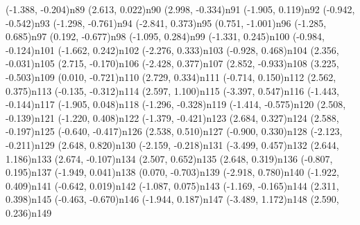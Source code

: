 \dotnode[dotstyle=Bsquare](-1.388, -0.204){n89}
\dotnode[dotstyle=Bo](2.613, 0.022){n90}
\dotnode[dotstyle=Bo](2.998, -0.334){n91}
\dotnode[dotstyle=Btriangle](-1.905, 0.119){n92}
\dotnode[dotstyle=Bsquare](-0.942, -0.542){n93}
\dotnode[dotstyle=Bsquare](-1.298, -0.761){n94}
\dotnode[dotstyle=Btriangle](-2.841, 0.373){n95}
\dotnode[dotstyle=Bsquare](0.751, -1.001){n96}
\dotnode[dotstyle=Btriangle](-1.285, 0.685){n97}
\dotnode[dotstyle=Bsquare](0.192, -0.677){n98}
\dotnode[dotstyle=Bsquare](-1.095, 0.284){n99}
\dotnode[dotstyle=Bsquare](-1.331, 0.245){n100}
\dotnode[dotstyle=Bsquare](-0.984, -0.124){n101}
\dotnode[dotstyle=Btriangle](-1.662, 0.242){n102}
\dotnode[dotstyle=Btriangle](-2.276, 0.333){n103}
\dotnode[dotstyle=Bsquare](-0.928, 0.468){n104}
\dotnode[dotstyle=Bo](2.356, -0.031){n105}
\dotnode[dotstyle=Bo](2.715, -0.170){n106}
\dotnode[dotstyle=Btriangle](-2.428, 0.377){n107}
\dotnode[dotstyle=Bo](2.852, -0.933){n108}
\dotnode[dotstyle=Bo](3.225, -0.503){n109}
\dotnode[dotstyle=Bsquare](0.010, -0.721){n110}
\dotnode[dotstyle=Bo](2.729, 0.334){n111}
\dotnode[dotstyle=Bsquare](-0.714, 0.150){n112}
\dotnode[dotstyle=Bo](2.562, 0.375){n113}
\dotnode[dotstyle=Bsquare](-0.135, -0.312){n114}
\dotnode[dotstyle=Bo](2.597, 1.100){n115}
\dotnode[dotstyle=Btriangle](-3.397, 0.547){n116}
\dotnode[dotstyle=Bsquare](-1.443, -0.144){n117}
\dotnode[dotstyle=Btriangle](-1.905, 0.048){n118}
\dotnode[dotstyle=Bsquare](-1.296, -0.328){n119}
\dotnode[dotstyle=Bsquare](-1.414, -0.575){n120}
\dotnode[dotstyle=Bo](2.508, -0.139){n121}
\dotnode[dotstyle=Bsquare](-1.220, 0.408){n122}
\dotnode[dotstyle=Bsquare](-1.379, -0.421){n123}
\dotnode[dotstyle=Bo](2.684, 0.327){n124}
\dotnode[dotstyle=Bo](2.588, -0.197){n125}
\dotnode[dotstyle=Bsquare](-0.640, -0.417){n126}
\dotnode[dotstyle=Bo](2.538, 0.510){n127}
\dotnode[dotstyle=Bsquare](-0.900, 0.330){n128}
\dotnode[dotstyle=Btriangle](-2.123, -0.211){n129}
\dotnode[dotstyle=Bo](2.648, 0.820){n130}
\dotnode[dotstyle=Btriangle](-2.159, -0.218){n131}
\dotnode[dotstyle=Btriangle](-3.499, 0.457){n132}
\dotnode[dotstyle=Bo](2.644, 1.186){n133}
\dotnode[dotstyle=Bo](2.674, -0.107){n134}
\dotnode[dotstyle=Bo](2.507, 0.652){n135}
\dotnode[dotstyle=Bo](2.648, 0.319){n136}
\dotnode[dotstyle=Bsquare](-0.807, 0.195){n137}
\dotnode[dotstyle=Btriangle](-1.949, 0.041){n138}
\dotnode[dotstyle=Bsquare](0.070, -0.703){n139}
\dotnode[dotstyle=Btriangle](-2.918, 0.780){n140}
\dotnode[dotstyle=Btriangle](-1.922, 0.409){n141}
\dotnode[dotstyle=Bsquare](-0.642, 0.019){n142}
\dotnode[dotstyle=Bsquare](-1.087, 0.075){n143}
\dotnode[dotstyle=Bsquare](-1.169, -0.165){n144}
\dotnode[dotstyle=Bo](2.311, 0.398){n145}
\dotnode[dotstyle=Bsquare](-0.463, -0.670){n146}
\dotnode[dotstyle=Btriangle](-1.944, 0.187){n147}
\dotnode[dotstyle=Btriangle](-3.489, 1.172){n148}
\dotnode[dotstyle=Bo](2.590, 0.236){n149}
